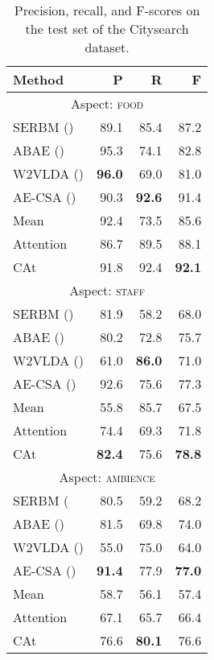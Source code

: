 \documentclass[11pt,a4paper]{article}
\newlength{\catheight}
\newcommand{\ourmodel}{CAt~\raisebox{-0.1ex}{\texttt{[image: fig/cat]}}} \definecolor{aspectcolor}{HTML}{fb7e5e}
\begin{document}
\begin{table}[t]\centering
\begin{tabular}{lrrr}
\textbf{Method} & \textbf{P} & \textbf{R} & \textbf{F} \\ \midrule
\multicolumn{4}{c}{Aspect: \textsc{food}} \\
SERBM (\citeyear{wang2015sentiment}) & 89.1  & 85.4  & 87.2  \\
ABAE (\citeyear{he2017unsupervised})      & 95.3  & 74.1  & 82.8  \\
W2VLDA (\citeyear{garcia2018w2vlda})    & \textbf{96.0} & 69.0  & 81.0  \\
AE-CSA (\citeyear{luo2019unsupervised})   & 90.3  & \textbf{92.6}  & 91.4  \\
Mean      & 92.4  & 73.5  & 85.6  \\
Attention & 86.7  & 89.5  & 88.1  \\
\ourmodel & 91.8  & 92.4 & \textbf{92.1}  \\ \midrule
\multicolumn{4}{c}{Aspect: \textsc{staff}} \\
SERBM (\citeyear{wang2015sentiment}) & 81.9  & 58.2  & 68.0  \\
ABAE (\citeyear{he2017unsupervised})     & 80.2  & 72.8  & 75.7  \\
W2VLDA (\citeyear{garcia2018w2vlda})   & 61.0  & \textbf{86.0}  & 71.0  \\
AE-CSA (\citeyear{luo2019unsupervised})   & 92.6  & 75.6  & 77.3  \\
Mean      & 55.8  & 85.7  & 67.5  \\
Attention & 74.4  & 69.3  & 71.8  \\
\ourmodel & \textbf{82.4}  & 75.6  & \textbf{78.8}  \\ \midrule
\multicolumn{4}{c}{Aspect: \textsc{ambience}}\\
SERBM (\citeyear{wang2015sentiment} & 80.5  & 59.2  & 68.2  \\
ABAE (\citeyear{he2017unsupervised})      & 81.5  & 69.8  & 74.0  \\
W2VLDA (\citeyear{garcia2018w2vlda})   & 55.0  & 75.0  & 64.0  \\
AE-CSA (\citeyear{luo2019unsupervised})   & \textbf{91.4}  & 77.9  & \textbf{77.0}  \\
Mean      & 58.7  & 56.1  & 57.4  \\
Attention & 67.1  & 65.7  & 66.4  \\
\ourmodel & 76.6  & \textbf{80.1}  & 76.6
\end{tabular}
\caption{Precision, recall, and F-scores on the test set of the Citysearch dataset.}\label{tblresults}
\end{table}
\end{document}
